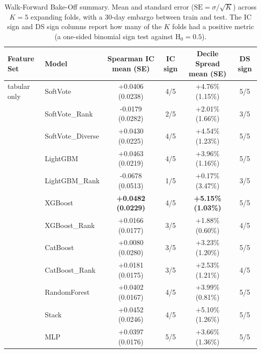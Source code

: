 \documentclass[10pt,journal,compsoc]{IEEEtran}
\begin{document}
\begin{table}[tbp]
\centering
\caption{Walk-Forward Bake-Off summary. Mean and standard error ($\text{SE}=\sigma/\sqrt{K}$) across $K=5$ expanding folds, with a 30-day embargo between train and test. The IC sign and DS sign columns report how many of the $K$ folds had a positive metric (a one-sided binomial sign test against $\text{H}_0=0.5$).}
\label{tab:walk_forward_full}
\small
\begin{tabular}{llcccc}
\toprule
\textbf{Feature Set} & \textbf{Model} & \textbf{Spearman IC mean (SE)} & \textbf{IC sign} & \textbf{Decile Spread mean (SE)} & \textbf{DS sign} \\
\midrule
tabular only           & SoftVote           & +0.0406 (0.0238)                 & 4/5 & +4.76\% (1.15\%)                 & 5/5 \\
                       & SoftVote\_Rank     & -0.0179 (0.0282)                 & 2/5 & +2.01\% (1.66\%)                 & 3/5 \\
                       & SoftVote\_Diverse  & +0.0430 (0.0225)                 & 4/5 & +4.54\% (1.23\%)                 & 5/5 \\
                       & LightGBM           & +0.0463 (0.0219)                 & 4/5 & +3.96\% (1.16\%)                 & 5/5 \\
                       & LightGBM\_Rank     & -0.0678 (0.0513)                 & 1/5 & +0.17\% (3.47\%)                 & 3/5 \\
                       & XGBoost            & \textbf{+0.0482 (0.0229)}        & 4/5 & \textbf{+5.15\% (1.03\%)}        & 5/5 \\
                       & XGBoost\_Rank      & +0.0166 (0.0177)                 & 3/5 & +1.88\% (0.60\%)                 & 4/5 \\
                       & CatBoost           & +0.0080 (0.0280)                 & 3/5 & +3.23\% (1.20\%)                 & 5/5 \\
                       & CatBoost\_Rank     & +0.0181 (0.0175)                 & 3/5 & +2.53\% (1.21\%)                 & 4/5 \\
                       & RandomForest       & +0.0402 (0.0167)                 & 4/5 & +3.99\% (0.81\%)                 & 5/5 \\
                       & Stack              & +0.0452 (0.0246)                 & 4/5 & +5.10\% (1.26\%)                 & 5/5 \\
                       & MLP                & +0.0397 (0.0176)                 & 5/5 & +3.66\% (1.36\%)                 & 5/5 \\

\end{tabular}
\end{table}
\end{document}
